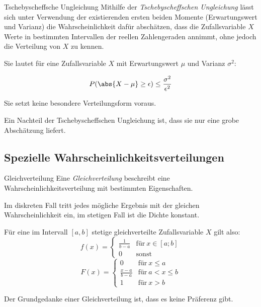 \begin{defi}{Tschebyscheffsche Ungleichung}
    Mithilfe der \emph{Tschebyscheffschen Ungleichung} lässt sich unter Verwendung der existierenden ersten beiden Momente (Erwartungswert und Varianz) die Wahrscheinlichkeit dafür abschätzen, dass die Zufallsvariable $X$ Werte in bestimmten Intervallen der reellen Zahlengeraden annimmt, ohne jedoch die Verteilung von $X$ zu kennen.

    Sie lautet für eine Zufallsvariable $X$ mit Erwartungswert $\mu$ und Varianz $\sigma^2$:

    \[
        P(\abs{X - \mu} \geq \epsilon) \leq \frac{\sigma^2}{\epsilon^2}
    \]

    Sie setzt keine besondere Verteilungsform voraus.

    Ein Nachteil der Tschebyscheffschen Ungleichung ist, dass sie nur eine grobe Abschätzung liefert.
\end{defi}

\subsection{Spezielle Wahrscheinlichkeitsverteilungen}

\begin{defi}{Gleichverteilung}
    Eine \emph{Gleichverteilung} beschreibt eine Wahrscheinlichkeitsverteilung mit bestimmten Eigenschaften.

    Im diskreten Fall tritt jedes mögliche Ergebnis mit der gleichen Wahrscheinlichkeit ein, im stetigen Fall ist die Dichte konstant.

    Für eine im Intervall $[a,b]$ stetige gleichverteilte Zufallsvariable $X$ gilt also:
    \[
        f(x) =
        \begin{cases}
            \frac{1}{b-a} & \text{für} \ x \in [a;b] \\
            0             & \text{sonst}
        \end{cases}
    \]
    \[
        F(x) =
        \begin{cases}
            0               & \text{für} \ x \leq a     \\
            \frac{x-a}{b-a} & \text{für} \ a < x \leq b \\
            1               & \text{für} \ x > b
        \end{cases}
    \]

    Der Grundgedanke einer Gleichverteilung ist, dass es keine Präferenz gibt.
\end{defi}


